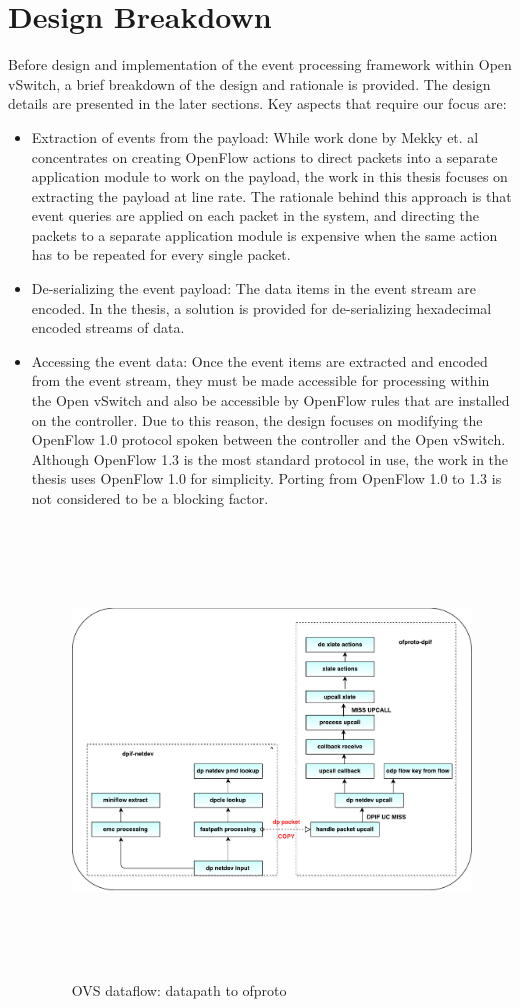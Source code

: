 \section{Design Breakdown}
Before design and implementation of the event processing framework within Open vSwitch, a brief breakdown of the design and rationale is provided. The design details are presented in the later sections. Key aspects that require our focus are:
\begin{itemize}
 \item Extraction of events from the payload: While work done by  Mekky et. al \cite{mekky2014application} concentrates on creating OpenFlow actions to direct packets into a separate application module to work on the payload, the work in this thesis focuses on extracting the payload at line rate. The rationale behind this approach is that event queries are applied on each packet in the system, and directing the packets to a separate application module is expensive when the same action has to be repeated for every single packet.
 \item De-serializing the event payload: The data items in the event stream are encoded. In the thesis, a solution is provided for de-serializing hexadecimal encoded streams of data. 
 \item Accessing the event data: Once the event items are extracted and encoded from the event stream, they must be made accessible for processing within the Open vSwitch and also be accessible by OpenFlow rules that are installed on the controller. Due to this reason, the design focuses on modifying the OpenFlow 1.0 protocol spoken between the controller and the Open vSwitch. Although OpenFlow 1.3 is the most standard protocol in use, the work in the thesis uses OpenFlow 1.0 for simplicity. Porting from OpenFlow 1.0 to 1.3 is not considered to be a blocking factor.
 \begin{figure}[H] 
 \centering   
 \caption{OVS dataflow: datapath to ofproto}
 \includegraphics[height=12cm]{dpnetdev.pdf}

\end{figure}
\end{itemize}
